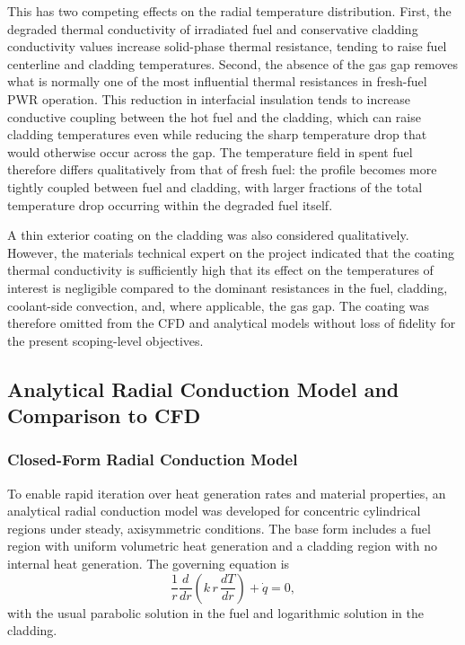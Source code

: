 This has two competing effects on the radial temperature distribution. First, the degraded thermal conductivity of irradiated fuel and conservative cladding conductivity values increase solid-phase thermal resistance, tending to raise fuel centerline and cladding temperatures. Second, the absence of the gas gap removes what is normally one of the most influential thermal resistances in fresh-fuel PWR operation. This reduction in interfacial insulation tends to increase conductive coupling between the hot fuel and the cladding, which can raise cladding temperatures even while reducing the sharp temperature drop that would otherwise occur across the gap. The temperature field in spent fuel therefore differs qualitatively from that of fresh fuel: the profile becomes more tightly coupled between fuel and cladding, with larger fractions of the total temperature drop occurring within the degraded fuel itself.

A thin exterior coating on the cladding was also considered qualitatively. However, the materials technical expert on the project indicated that the coating thermal conductivity is sufficiently high that its effect on the temperatures of interest is negligible compared to the dominant resistances in the fuel, cladding, coolant-side convection, and, where applicable, the gas gap. The coating was therefore omitted from the CFD and analytical models without loss of fidelity for the present scoping-level objectives.

\subsection{Analytical Radial Conduction Model and Comparison to CFD}
\label{sec:analytic-vs-cfd}

\subsubsection{Closed-Form Radial Conduction Model}

To enable rapid iteration over heat generation rates and material properties, an analytical radial conduction model was developed for concentric cylindrical regions under steady, axisymmetric conditions. The base form includes a fuel region with uniform volumetric heat generation and a cladding region with no internal heat generation. The governing equation is
\[
\frac{1}{r}\frac{d}{dr}\left(k\,r\,\frac{dT}{dr}\right) + \dot{q} = 0,
\]
with the usual parabolic solution in the fuel and logarithmic solution in the cladding.

